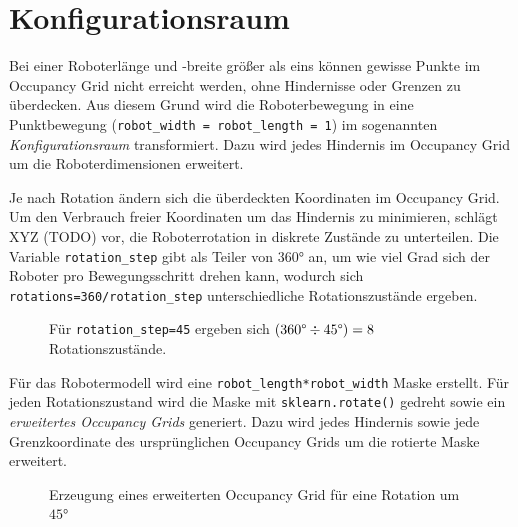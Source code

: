 \chapter{Konfigurationsraum}


Bei einer Roboterlänge und -breite größer als eins können gewisse Punkte im Occupancy Grid nicht erreicht werden, ohne Hindernisse oder Grenzen zu überdecken. 
Aus diesem Grund wird die Roboterbewegung in eine Punktbewegung (\texttt{robot\_width =  robot\_length = 1}) im sogenannten \textit{Konfigurationsraum} transformiert.
Dazu wird jedes Hindernis im Occupancy Grid um die Roboterdimensionen erweitert.

Je nach Rotation ändern sich die überdeckten Koordinaten im Occupancy Grid.
Um den Verbrauch freier Koordinaten um das Hindernis zu minimieren, schlägt XYZ (TODO) vor, die Roboterrotation in diskrete Zustände zu unterteilen. Die Variable \texttt{rotation\_step} gibt als Teiler von $360$° an, um wie viel Grad sich der Roboter pro Bewegungsschritt drehen kann, wodurch sich \texttt{rotations=360/\texttt{rotation\_step}} unterschiedliche Rotationszustände ergeben.
\begin{figure}[H]
	\centering
	\footnotesize
	\centerline{\resizebox{0.6\linewidth}{!}{}}
	\caption{Für \texttt{rotation\_step=45} ergeben sich $(360 \text{\textdegree} \div 45 \text{\textdegree}) = 8$ Rotationszustände.}
\end{figure}

\vspace*{-0.3cm}
Für das Robotermodell wird eine \texttt{robot\_length*robot\_width} Maske erstellt.
Für jeden Rotationszustand wird die Maske mit \texttt{sklearn.rotate()} gedreht sowie ein \textit{erweitertes Occupancy Grids} generiert. Dazu wird jedes Hindernis sowie jede Grenzkoordinate des ursprünglichen Occupancy Grids um die rotierte Maske erweitert.
\vspace*{0.12cm}
\begin{figure}[H]
	\centering
	\footnotesize
	\centerline{\resizebox{0.9\linewidth}{!}{}}
	\caption{Erzeugung eines erweiterten Occupancy Grid für eine Rotation um $45$°}
\end{figure}

